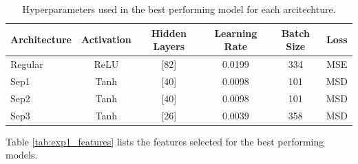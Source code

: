 \begin{table}[!htbp]
    \centering
    \caption{Hyperparameters used in the best performing model for each arcitechture.}
    \begin{tabular}{lccccc}
        \toprule
        Architecture & Activation & Hidden Layers & Learning Rate & Batch Size & Loss \\
        \midrule
        Regular &  ReLU & [82] & 0.0199 & 334 & MSE \\
        Sep1    &  Tanh & [40] & 0.0098 & 101 & MSD \\
        Sep2    &  Tanh & [40] & 0.0098 & 101 & MSD \\
        Sep3    &  Tanh & [26] & 0.0039 & 358 & MSD \\
        \bottomrule
    \end{tabular}
    \label{tab:exp1_hyperparameters_best_model}
\end{table}



Table \ref{tab:exp1_features} lists the features selected for the best performing models.


